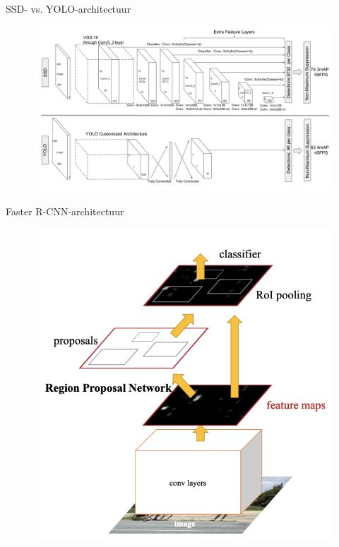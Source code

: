 \documentclass[aspectratio=169]{beamer}
\begin{document}
    \begin{frame}{SSD- vs. YOLO-architectuur}
        \begin{figure}
            \centering
            \includegraphics[height=0.9\textheight]{ssd_architecture.png}
        \end{figure}
    \end{frame}
    
    \begin{frame}{Faster R-CNN-architectuur}
        \begin{figure}
            \centering
            \includegraphics[height=0.9\textheight]{faster_rcnn_architecture.png}
        \end{figure}
    \end{frame}
    
\end{document}
